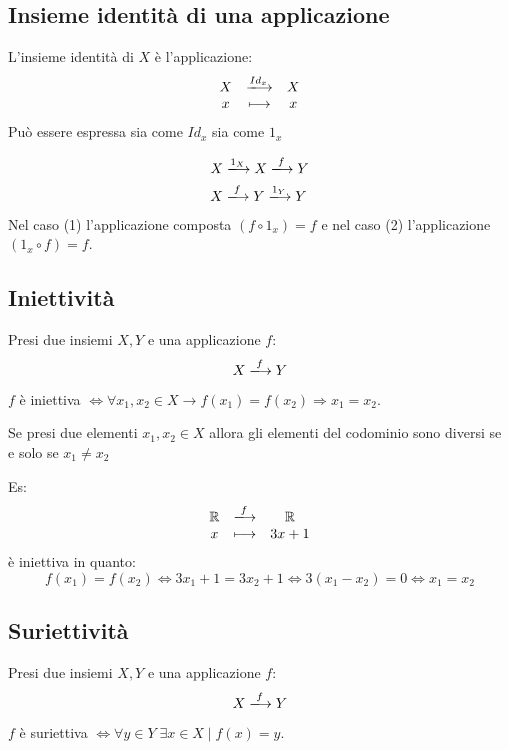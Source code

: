 \documentclass[a4paper,12pt]{article}
\begin{document}
	\subsection{Insieme identità di una applicazione}
	L'insieme identità di $X$ è l'applicazione:
	\[
	\begin{array}{c c c}
		X & \xlongrightarrow{Id_x} & X \\
		x & \longmapsto & x \\
	\end{array}
	\]
	Può essere espressa sia come $Id_x$ sia come $1_x$
	
	\setcounter{equation}{0}
	\begin{align}
		X & \xlongrightarrow{1_X} X \xlongrightarrow{f} Y \\
		X & \xlongrightarrow{f} Y \xlongrightarrow{1_Y} Y
	\end{align}
	Nel caso (1) l'applicazione composta $(f \circ 1_x) = f$ e nel caso (2) l'applicazione $(1_x \circ f) = f$.
	
	\subsection{Iniettività}
	Presi due insiemi $X, Y$ e una applicazione $f$:
	\[
	X \xlongrightarrow{f} Y
	\] 
	
	\begin{center}
		$f$ è iniettiva $\iff \forall x_1,x_2 \in X \rightarrow f(x_1) = f(x_2) \Rightarrow x_1 = x_2$.
	\end{center}
	
	Se presi due elementi $x_1, x_2 \in X$ allora gli elementi del codominio sono diversi se e solo se $x_1 \not = x_2$
	
	Es: 
	\[
	\begin{array}{c c c}
		\mathbb{R} & \xlongrightarrow{f} & \mathbb{R} \\
		x & \longmapsto & 3x + 1\\
	\end{array}
	\]
	è iniettiva in quanto:
	\[
	f(x_1) = f(x_2) \iff 3x_1 + 1 = 3x_2 + 1 \iff 3(x_1 - x_2) = 0 \iff x_1 = x_2
	\]
	
	\subsection{Suriettività}
	Presi due insiemi $X, Y$ e una applicazione $f$:
	\[
	X \xlongrightarrow{f} Y
	\] 
	
	\begin{center}
		$f$ è suriettiva $\iff \forall y \in Y \; \exists x\in X \mid f(x) = y$.
	\end{center}
	
\end{document}
